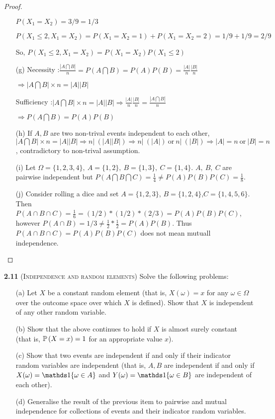 \begin{proof}
\begin{enumerate}
$P(X_1 = X_2)=3/9=1/3$

$P(X_1 \leq 2,X_1 = X_2)=P(X_1 = X_2=1)+P(X_1 = X_2=2)=1/9+1/9=2/9$

So, $P(X_1 \leq 2,X_1 = X_2)=P(X_1 = X_2)P(X_1 \leq 2)$

\item[(g)]Necessity :$\frac{|A\bigcap B|}{n}=P(A \bigcap B)=P(A)P(B)=\frac{|A|}{n}\frac{|B|}{n}$

$\Rightarrow |A\bigcap B|\times n = |A||B|$

Sufficiency :$|A\bigcap B|\times n = |A||B|\Rightarrow \frac{|A|}{n}\frac{|B|}{n}=\frac{|A\bigcap B|}{n}$

$\Rightarrow P(A \bigcap B)=P(A)P(B)$

\item[(h)] If $A,B$ are two non-trival events independent to each other, $|A\bigcap B|\times n = |A||B|\Rightarrow n| \ (|A||B|) \Rightarrow n|\ (|A|) \ \text{or}\  n |\ (|B|) \Rightarrow |A| = n\ \text{or}\ |B| = n$, contradictory to non-trival assumption.
   
\item[(i)] Let $\Omega = \{1,2,3,4\},\ A = \{1,2\},\ B = \{1,3\},\ C = \{1,4\}$. $A,\ B,\ C$ are pairwise independent but $P(A\bigcap B \bigcap C) = \frac{1}{4} \neq P(A) P(B)P(C) = \frac{1}{8}$.

\item[(j)]Consider rolling a dice and set $A=\{1,2,3\}$, $B=\{1,2,4\}$,$C=\{1,4,5,6\}$. Then $P(A \cap B \cap C)=\frac{1}{6} = (1/2)*(1/2)*(2/3) = P(A)P(B)P(C)$, however $P(A\cap B)=1/3 \neq \frac{1}{2}*\frac{1}{2} = P(A) P(B)$. Thus $P(A \cap B \cap C) =  P(A)P(B)P(C) $ does not mean mutuall independence. 
\end{enumerate}
\end{proof}

\noindent\textbf{2.11}
(\textsc{Independence and random elements}) Solve the following problems:
\begin{enumerate}
    \item[(a)] Let $X$ be a constant random element (that is, $X(\omega) = x$ for any $\omega \in \Omega$ over the outcome space over which $X$ is defined). Show that $X$ is independent of any other random variable.
    \item[(b)] Show that the above continues to hold if $X$ is almost surely constant (that is, $\mathbb{P} \left(X=x\right)=1$ for an appropriate value $x$).
    \item[(c)] Show that two events are independent if and only if their indicator random variables are independent (that is, $A, B$ are independent if and only if $X(\omega) = \bOne{\omega \in A}$ and $Y(\omega) = \bOne{\omega \in B}$ are independent of each other).
    \item[(d)] Generalise the result of the previous item to pairwise and mutual independence for collections of events and their indicator random variables.
\end{enumerate}

